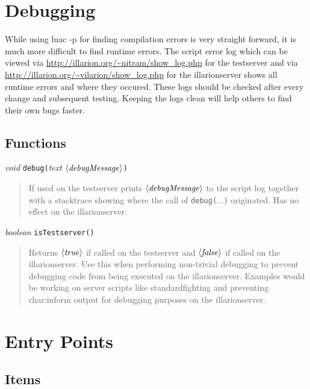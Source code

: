 \documentclass[a4paper,10pt,makeidx]{scrreprt}
\newcommand{\com}[2]{\index{#1}\texttt{#1(}#2\texttt{)}}
\newcommand{\var}[1]{$\left\langle \text{\emph{#1}} \right\rangle$}
\newcommand{\void}{\textsl{void }}
\newcommand{\txt}{\textsl{text }}
\newcommand{\bool}{\textsl{boolean }}
\begin{document}
\chapter{Debugging}
While using luac -p for finding compilation errors is very straight forward, it is much more difficult to find runtime errors. The script error log which can be viewed via \url{http://illarion.org/~nitram/show_log.php} for the testserver and via \url{http://illarion.org/~vilarion/show_log.php} for the illarionserver shows all runtime errors and where they occured. These logs should be checked after every change and subsequent testing. Keeping the logs clean will help others to find their own bugs faster.

\section{Functions}
\void \com{debug}{\txt \var{debugMessage}}
\begin{quote}
       If used on the testserver prints \var{debugMessage} to the script log together with a stacktrace showing where the call of \com{debug}{...} originated. Has no effect on the illarionserver.
\end{quote}
\bool \com{isTestserver}{}
\begin{quote}
       Returns \var{true} if called on the testserver and \var{false} if called on the illarionserver. Use this when performing non-trivial debugging to prevent debugging code from being executed on the illarionserver. Examples would be working on server scripts like standardfighting and preventing char:inform output for debugging purposes on the illarionserver.
\end{quote}

\chapter{Entry Points}

\section{Items}
\end{document}
